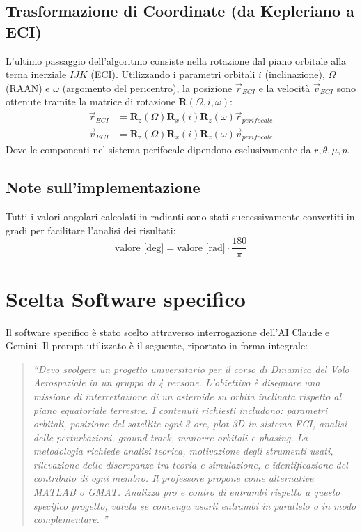 \documentclass[12pt, a4paper]{article}
\begin{document}
\subsection{Trasformazione di Coordinate (da Kepleriano a ECI)}
L'ultimo passaggio dell'algoritmo consiste nella rotazione dal piano orbitale alla terna inerziale $IJK$ (ECI). Utilizzando i parametri orbitali $i$ (inclinazione), $\Omega$ (RAAN) e $\omega$ (argomento del pericentro), la posizione $\vec{r}_{ECI}$ e la velocità $\vec{v}_{ECI}$ sono ottenute tramite la matrice di rotazione $\mathbf{R}(\Omega, i, \omega)$:
\begin{align}
    \vec{r}_{ECI} &= \mathbf{R}_{z}(\Omega) \mathbf{R}_{x}(i) \mathbf{R}_{z}(\omega) \vec{r}_{perifocale} \\
    \vec{v}_{ECI} &= \mathbf{R}_{z}(\Omega) \mathbf{R}_{x}(i) \mathbf{R}_{z}(\omega) \vec{v}_{perifocale}
\end{align}
Dove le componenti nel sistema perifocale dipendono esclusivamente da $r, \theta, \mu, p$.

\subsection{Note sull'implementazione}
Tutti i valori angolari calcolati in radianti sono stati successivamente convertiti in gradi per facilitare l'analisi dei risultati:
\begin{equation}
    \text{valore [deg]} = \text{valore [rad]} \cdot \frac{180}{\pi}
\end{equation}
\section{Scelta Software specifico}
Il software specifico è stato scelto attraverso interrogazione dell'AI Claude e Gemini. Il prompt utilizzato è il seguente, riportato in forma integrale:  

\begin{quote}
    \itshape %
    \textsf{ %
        ``Devo svolgere un progetto universitario per il corso di Dinamica del Volo Aerospaziale in un gruppo di 4 persone. L'obiettivo è disegnare una missione di intercettazione di un asteroide su orbita inclinata rispetto al piano equatoriale terrestre. I contenuti richiesti includono: parametri orbitali, posizione del satellite ogni 3 ore, plot 3D in sistema ECI, analisi delle perturbazioni, ground track, manovre orbitali e phasing. La metodologia richiede analisi teorica, motivazione degli strumenti usati, rilevazione delle discrepanze tra teoria e simulazione, e identificazione del contributo di ogni membro. Il professore propone come alternative MATLAB o GMAT. Analizza pro e contro di entrambi rispetto a questo specifico progetto, valuta se convenga usarli entrambi in parallelo o in modo complementare. ''
    }
\end{quote}
\end{document}
